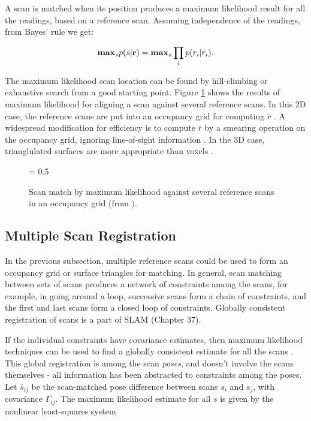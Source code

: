 \documentclass[twocolumn,oneside]{book}
\begin{document}
A scan is matched when its position produces a maximum likelihood
result for all the readings, based on a reference scan.  Assuming
independence of the readings, from Bayes' rule we get:

$$ {\bf max}_s p(s | {\bf r}) = {\bf max}_s \prod_i p(r_i | \bar
r_i).$$

The maximum likelihood scan location can be found by hill-climbing or
exhaustive search from a good starting point.  Figure
\ref{scanmatch.ch22} shows the results of maximum likelihood for
aligning a scan against several reference scans.  In this 2D case, the
reference scans are put into an occupancy grid for computing $\bar r$
\cite{haehnel02b}.  A widespread modification for efficiency is to compute $\bar
r$ by a smearing operation on the occupancy grid, ignoring
line-of-sight information \cite{konolige99}.  In the 3D case, trianglulated
surfaces are more appropriate than voxels \cite{haehnel02}.

\begin{figure}[htb]
{\epsfxsize = 0.5\textwidth {}}
\caption{Scan match by maximum likelihood against several reference
scans in an occupancy grid (from \cite{haehnel02b}).
\label{scanmatch.ch22}}
\end{figure}

\subsection{Multiple Scan Registration}

In the previous subsection, multiple reference scans could be used to
form an occupancy grid or surface triangles for matching.  In general,
scan matching between sets of scans produces a network of constraints
among the scans, for example, in going around a loop, successive scans
form a chain of constraints, and the first and last scans form a
closed loop of constraints.  Globally consistent registration of scans
is a part of SLAM (Chapter 37).

If the individual constraints have covariance estimates, then maximum
likelihood techniques can be used to find a globally consistent
estimate for all the scans \cite{lu97}.  This global registration
is among the scan {\em poses}, and doesn't involve the scans
themselves - all information has been abstracted to constraints among
the poses.  Let $\bar{s}_{ij}$ be the scan-matched pose difference
between scans $s_i$ and $s_j$, with covariance $\Gamma_{ij}$.  The
maximum likelihood estimate for all $s$ is given by the nonlinear
least-squares system
\end{document}
